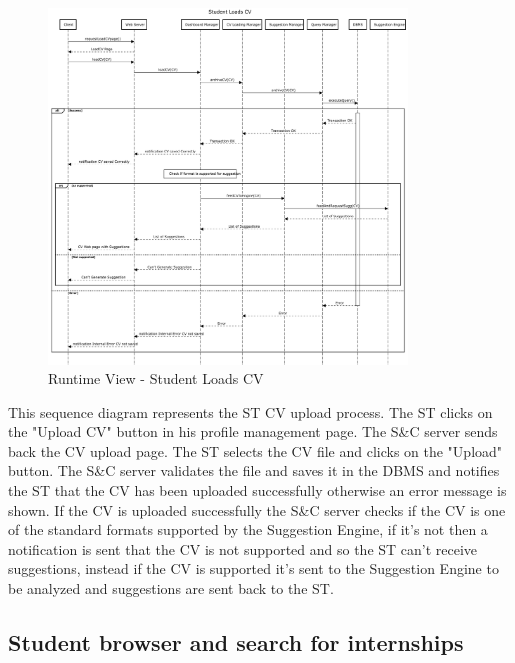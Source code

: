 \begin{figure}[H]
      \centering
      \includegraphics[width=0.85\textwidth]{Images/RV_02.pdf}
      \caption{Runtime View - Student Loads CV}
      \label{fig:rv-student-loads-cv}
\end{figure}

\par This sequence diagram represents the ST CV upload process. The ST clicks on the "Upload CV" button in his profile
management page. The S\&C server sends back the CV upload page. The ST selects the CV file and clicks on the "Upload" button.
The S\&C server validates the file and saves it in the DBMS and notifies the ST that the CV has been uploaded successfully
otherwise an error message is shown. If the CV is uploaded successfully the S\&C server checks if the CV is one of the
standard formats supported by the Suggestion Engine, if it's not then a notification is sent that the CV is not supported and
so the ST can't receive suggestions, instead if the CV is supported it's sent to the Suggestion Engine to be analyzed and
suggestions are sent back to the ST.

\subsection{Student browser and search for internships}
\label{sub:student-browser-and-search-for-internships}%

